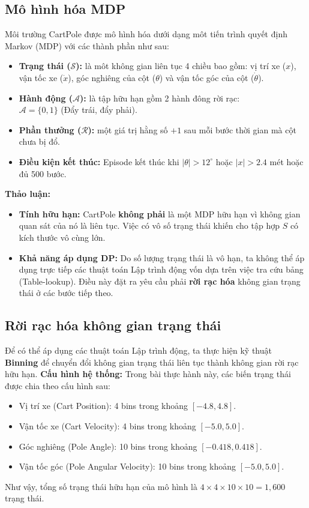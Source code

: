 \subsection{Mô hình hóa MDP}
Môi trường CartPole được mô hình hóa dưới dạng môt tiến trình quyết định Markov (MDP) với các thành phần như sau:
\begin{itemize}
    \item \textbf{Trạng thái ($\mathcal{S}$):} là môt không gian liên tục 4 chiều bao gồm: vị trí xe (\(x\)), vận tốc xe (\(\dot{x}\)), góc nghiêng của cột (\(\theta\)) và vận tốc góc của cột (\(\dot{\theta}\)).
    \item \textbf{Hành động ($\mathcal{A}$):} là tập hữu hạn gồm 2 hành đông rời rạc: \\
    $\mathcal{A} = \{0, 1\}$ (Đẩy trái, đẩy phải).
    \item \textbf{Phần thưởng ($\mathcal{R}$):} một giá trị hằng số $+1$ sau mỗi bước thời gian mà cột chưa bị đổ.
    \item \textbf{Điều kiện kết thúc:} Episode kết thúc khi $|\theta| > 12^{\circ}$ hoặc $|x| > 2.4$ mét hoặc đủ 500 bước.
\end{itemize}
\textbf{Thảo luận:}
\begin{itemize}
    \item \textbf{Tính hữu hạn:} CartPole \textbf{không phải} là một MDP hữu hạn vì không gian quan sát của nó là liên tục. Việc có vô số trạng thái khiến cho tập hợp $S$ có kích thước vô cùng lớn.
    \item \textbf{Khả năng áp dụng DP:} Do số lượng trạng thái là vô hạn, ta không thể áp dụng trực tiếp các thuật toán Lập trình động vốn dựa trên việc tra cứu bảng (Table-lookup). Điều này đặt ra yêu cầu phải \textbf{rời rạc hóa} không gian trạng thái ở các bước tiếp theo.
\end{itemize}

\subsection{Rời rạc hóa không gian trạng thái}
Để có thể áp dụng các thuật toán Lập trình động, ta thực hiện kỹ thuật \textbf{Binning} để chuyển đổi không gian trạng thái liên tục thành không gian rời rạc hữu hạn. 
\textbf{Cấu hình hệ thống:}
Trong bài thực hành này, các biến trạng thái được chia theo cấu hình sau:
\begin{itemize}
    \item Vị trí xe (Cart Position): 4 bins trong khoảng $[-4.8, 4.8]$.
    \item Vận tốc xe (Cart Velocity): 4 bins trong khoảng $[-5.0, 5.0]$.
    \item Góc nghiêng (Pole Angle): 10 bins trong khoảng $[-0.418, 0.418]$.
    \item Vận tốc góc (Pole Angular Velocity): 10 bins trong khoảng $[-5.0, 5.0]$.
\end{itemize}
Như vậy, tổng số trạng thái hữu hạn của mô hình là $4 \times 4 \times 10 \times 10 = 1,600$ trạng thái.

